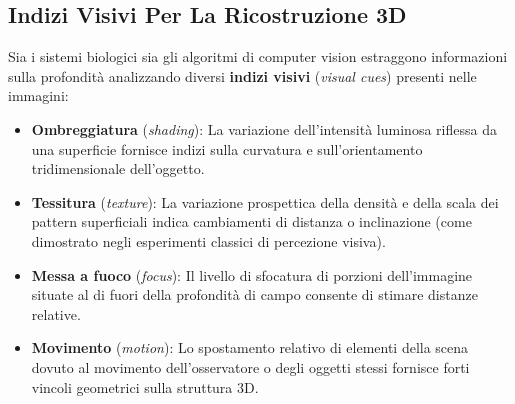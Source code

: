 ﻿\documentclass[11pt, a4paper]{article}
\begin{document}



\subsection{Indizi Visivi Per La Ricostruzione 3D}

Sia i sistemi biologici sia gli algoritmi di computer vision estraggono informazioni sulla profondità analizzando diversi \textbf{indizi visivi} (\emph{visual cues}) presenti nelle immagini:

\begin{itemize}[noitemsep]
    \item \textbf{Ombreggiatura} (\emph{shading}): La variazione dell'intensità luminosa riflessa da una superficie fornisce indizi sulla curvatura e sull'orientamento tridimensionale dell'oggetto.


    \item \textbf{Tessitura} (\emph{texture}): La variazione prospettica della densità e della scala dei pattern superficiali indica cambiamenti di distanza o inclinazione (come dimostrato negli esperimenti classici di percezione visiva).


    \item \textbf{Messa a fuoco} (\emph{focus}): Il livello di sfocatura di porzioni dell'immagine situate al di fuori della profondità di campo consente di stimare distanze relative.


    \item \textbf{Movimento} (\emph{motion}): Lo spostamento relativo di elementi della scena dovuto al movimento dell'osservatore o degli oggetti stessi fornisce forti vincoli geometrici sulla struttura 3D.

\end{itemize}
\end{document}
